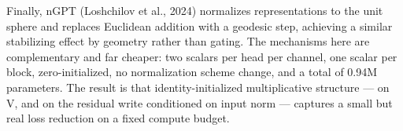 \documentclass[11pt,a4paper]{article}
\begin{document}
Finally, nGPT (Loshchilov et al., 2024) normalizes representations to the unit sphere and replaces Euclidean addition with a geodesic step, achieving a similar stabilizing effect by geometry rather than gating. The mechanisms here are complementary and far cheaper: two scalars per head per channel, one scalar per block, zero-initialized, no normalization scheme change, and a total of 0.94M parameters. The result is that identity-initialized multiplicative structure --- on V, and on the residual write conditioned on input norm --- captures a small but real loss reduction on a fixed compute budget.
\end{document}
